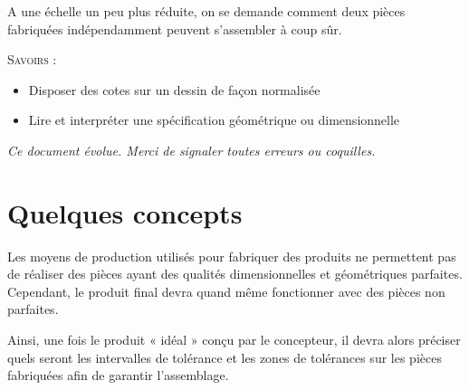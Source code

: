 \documentclass[11pt,oneside]{article}
\begin{document}
A une échelle un peu plus réduite, on se demande comment deux pièces fabriquées indépendamment peuvent s'assembler à coup sûr.










\begin{savoir}
\textsc{Savoirs :}
\begin{itemize}
\item Disposer des cotes sur un dessin de façon normalisée
\item Lire et interpréter une spécification géométrique ou dimensionnelle
\end{itemize}
\end{savoir}
 

\setlength{\parskip}{0ex plus 0.2ex minus 0ex}
 \renewcommand{\contentsname}{}
 \renewcommand{\baselinestretch}{1}

\tableofcontents

 \renewcommand{\baselinestretch}{1.2}
\setlength{\parskip}{2ex plus 0.5ex minus 0.2ex}

\textit{Ce document évolue. Merci de signaler toutes erreurs ou coquilles.}



\section{Quelques concepts}

Les moyens de production utilisés pour fabriquer des produits ne permettent pas de réaliser des pièces ayant des qualités dimensionnelles et géométriques parfaites. Cependant, le produit final devra quand même fonctionner avec des pièces non parfaites. 

Ainsi, une fois le produit « idéal » conçu par le concepteur, il devra alors préciser quels seront les intervalles de tolérance et les zones de tolérances sur les pièces fabriquées afin de garantir l'assemblage. 
\end{document}

